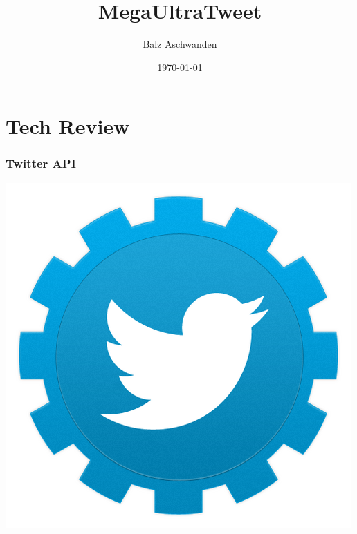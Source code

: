 \documentclass{beamer}
\title{MegaUltraTweet}
\author{Balz Aschwanden}
\date{\today}
\begin{document}
\frame{\titlepage}

\section{Tech Review}
\begin{frame}
  \frametitle{Twitter API}
  \begin{center}
      \includegraphics[height=.8\textheight]{TwitterAPI}
  \end{center}

\end{frame}
\end{document}
